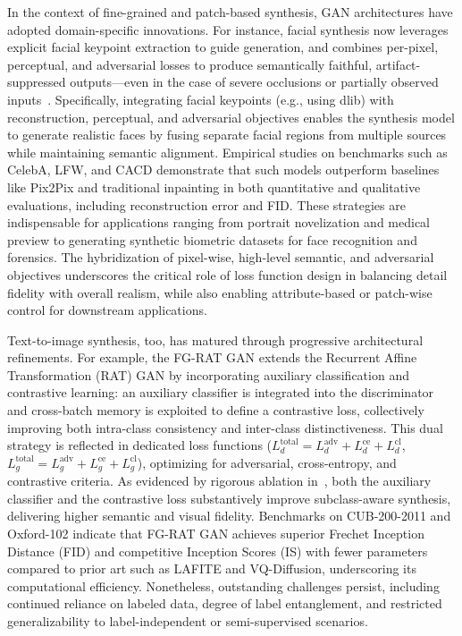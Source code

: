\documentclass[sigconf]{acmart}
\begin{document}
In the context of fine-grained and patch-based synthesis, GAN architectures have adopted domain-specific innovations. For instance, facial synthesis now leverages explicit facial keypoint extraction to guide generation, and combines per-pixel, perceptual, and adversarial losses to produce semantically faithful, artifact-suppressed outputs---even in the case of severe occlusions or partially observed inputs~\cite{ref97}. Specifically, integrating facial keypoints (e.g., using dlib) with reconstruction, perceptual, and adversarial objectives enables the synthesis model to generate realistic faces by fusing separate facial regions from multiple sources while maintaining semantic alignment. Empirical studies on benchmarks such as CelebA, LFW, and CACD demonstrate that such models outperform baselines like Pix2Pix and traditional inpainting in both quantitative and qualitative evaluations, including reconstruction error and FID. These strategies are indispensable for applications ranging from portrait novelization and medical preview to generating synthetic biometric datasets for face recognition and forensics. The hybridization of pixel-wise, high-level semantic, and adversarial objectives underscores the critical role of loss function design in balancing detail fidelity with overall realism, while also enabling attribute-based or patch-wise control for downstream applications.

Text-to-image synthesis, too, has matured through progressive architectural refinements. For example, the FG-RAT GAN extends the Recurrent Affine Transformation (RAT) GAN by incorporating auxiliary classification and contrastive learning: an auxiliary classifier is integrated into the discriminator and cross-batch memory is exploited to define a contrastive loss, collectively improving both intra-class consistency and inter-class distinctiveness. This dual strategy is reflected in dedicated loss functions (\(L_d^\text{total} = L_d^\text{adv} + L_d^\text{ce} + L_d^\text{cl}\), \(L_g^\text{total} = L_g^\text{adv} + L_g^\text{ce} + L_g^\text{cl}\)), optimizing for adversarial, cross-entropy, and contrastive criteria. As evidenced by rigorous ablation in~\cite{ref101}, both the auxiliary classifier and the contrastive loss substantively improve subclass-aware synthesis, delivering higher semantic and visual fidelity. Benchmarks on CUB-200-2011 and Oxford-102 indicate that FG-RAT GAN achieves superior Frechet Inception Distance (FID) and competitive Inception Scores (IS) with fewer parameters compared to prior art such as LAFITE and VQ-Diffusion, underscoring its computational efficiency. Nonetheless, outstanding challenges persist, including continued reliance on labeled data, degree of label entanglement, and restricted generalizability to label-independent or semi-supervised scenarios.
\end{document}
